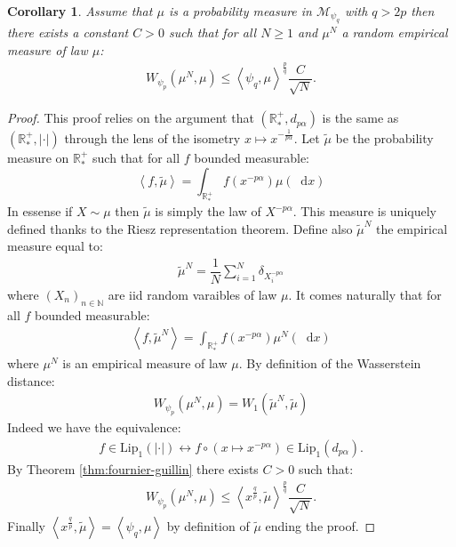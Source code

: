\documentclass[11pt,a4paper]{article}
\newcommand{\RRP}{\mathbb{R}^+_*}
\newcommand{\MC}{\mathcal{M}}
\newcommand{\Seq}[1]{\left(#1\right)_{n\in \mathbb{N}}}
\newcommand{\brac}[1]{\left\langle#1\right\rangle}
\newcommand{\dd}{\mathop{}\!\mathrm{d}}
\newtheorem{corollary}[theorem]{Corollary}
\begin{document}
\begin{corollary}\label{cor:fournier_guillin}
    Assume that $\mu$ is a probability measure in $\MC_{\psi_q}$ with $q > 2p$ then there exists a constant $C>0$ such that for all $N \geq 1$ and $\mu^N$ a random empirical measure of law $\mu$:
    \begin{align*}
        W_{\psi_p}\left(\mu^N,\mu \right) \leq \brac{\psi_q,\mu}^{\frac{p}{q}}  \dfrac{C}{\sqrt{N}}.
    \end{align*} 
\end{corollary}
\begin{proof}
    This proof relies on the argument that $\left(\RRP,d_{p\alpha}\right)$ is the same as $\left(\RRP,|\cdot|\right)$ through the lens of the isometry $x \mapsto x^{-\frac{1}{p\alpha}}$. Let $\tilde{\mu}$ be the probability measure on $\RRP$ such that for all $f$  bounded measurable:
    \[\brac{f,\tilde{\mu}} = \int_{\RRP} f(x^{-p\alpha}) \mu(\dd x)\]
    In essense if $X \sim \mu$ then $\tilde{\mu}$ is simply the law of $X^{-p\alpha}$. This measure is uniquely defined thanks to the Riesz representation theorem. Define also $\tilde{\mu}^N$ the empirical measure equal to:
    \begin{align*}
        \tilde{\mu}^N = \dfrac{1}{N} \sum\limits_{i = 1}^N \delta_{X_i^{-p\alpha}}
    \end{align*}
    where $\Seq{X_n}$ are iid random varaibles of law $\mu$. It comes naturally that for all $f$  bounded measurable:
    \begin{align*}
        \brac{f,\tilde{\mu}^N} = \int_{\RRP} f(x^{-p\alpha}) \mu^N(\dd x)
    \end{align*}
    where $\mu^N$ is  an empirical measure of law $\mu$. By definition of the Wasserstein distance:
    \begin{align*}
        W_{\psi_p}\left(\mu^N,\mu\right) = W_1\left(\tilde{\mu}^N,\tilde{\mu}\right)  
    \end{align*}
    Indeed we have the equivalence:
    \begin{align*}
        f \in \text{Lip}_1(|\cdot|) \leftrightarrow f\circ(x \mapsto x^{-p\alpha}) \in \text{Lip}_1(d_{p\alpha}).
    \end{align*}
    By Theorem \ref{thm:fournier-guillin} there exists $C > 0$ such that:
    \begin{align*}
        W_{\psi_p}\left(\mu^N,\mu\right) \leq \brac{x^{\frac{q}{p}},\tilde{\mu}}^{\frac{p}{q}} \dfrac{C}{\sqrt{N}}.
    \end{align*}
    Finally $\brac{x^{\frac{q}{p}},\tilde{\mu}} = \brac{\psi_q,\mu}$ by definition of $\tilde{\mu}$ ending the proof.
\end{proof}
\end{document}
